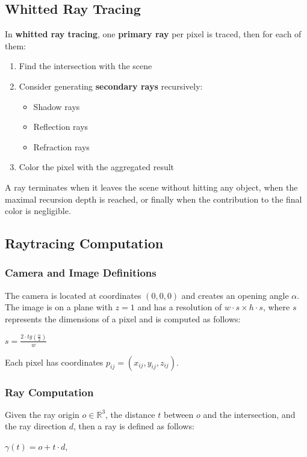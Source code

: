 \documentclass{article}
\begin{document}
\subsection{Whitted Ray Tracing}
In \textbf{whitted ray tracing}, one \textbf{primary ray} per pixel is traced, then for each of them:
\begin{enumerate}
    \item Find the intersection with the scene
    \item Consider generating \textbf{secondary rays} recursively:
        \begin{itemize}
            \item Shadow rays
            \item Reflection rays
            \item Refraction rays
        \end{itemize}
    \item Color the pixel with the aggregated result 
\end{enumerate}
A ray terminates when it leaves the scene without hitting any object, when the maximal recursion depth is reached, or finally when the contribution to the final color is negligible.
\newpage
\subsection{Raytracing Computation}
\subsubsection{Camera and Image Definitions}
The camera is located at coordinates $(0,0,0)$ and creates an opening angle $\alpha$.
The image is on a plane with $z = 1$ and has a resolution of $w\cdot s \times h\cdot s$, where $s$ represents the dimensions of a pixel and is computed as follows:
\begin{center}
    $ s = \displaystyle\frac{2 \cdot tg(\displaystyle\frac{\alpha}{2})}{w} $
\end{center}
Each pixel has coordinates $p_{ij} = (x_{ij}, y_{ij}, z_{ij})$.
\subsubsection{Ray Computation}
Given the ray origin $o \in \mathbb{R}^3$, the distance $t$ between $o$ and the intersection, and the ray direction $d$, then a ray is defined as follows:
\begin{center}
    $\gamma(t) = o + t \cdot d$,
\end{center}
\end{document}
